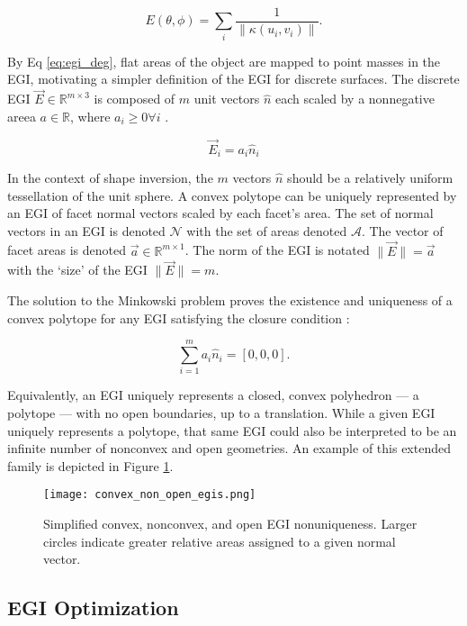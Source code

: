 \begin{equation} \label{eq:egi_deg}
  E(\theta, \phi) = \sum_i{\frac{1}{\| \kappa(u_i, v_i) \|}}.
\end{equation}

By Eq \ref{eq:egi_deg}, flat areas of the object are mapped to point masses in the EGI, motivating a simpler definition of the EGI for discrete surfaces. The discrete EGI $\vec{E} \in \mathbb{R}^{m \times 3}$ is composed of $m$ unit vectors $\hat{n}$ each scaled by a nonnegative areea $a \in \mathbb{R}$, where $a_i \geq 0 \forall i$ \cite{little1983}.

\begin{equation}
  \vec{E}_i = a_i \hat{n}_i
\end{equation}

In the context of shape inversion, the $m$ vectors $\hat{n}$ should be a relatively uniform tessellation of the unit sphere. A convex polytope can be uniquely represented by an EGI of facet normal vectors scaled by each facet's area. The set of normal vectors in an EGI is denoted $\mathcal{N}$ with the set of areas denoted $\mathcal{A}$. The vector of facet areas is denoted $\vec{a} \in \mathbb{R}^{m \times 1}$. The norm of the EGI is notated $\| \vec{E} \| = \vec{a}$ with the `size' of the EGI $\|\vec{E}\| = m$.

The solution to the Minkowski problem proves the existence and uniqueness of a convex polytope for any EGI satisfying the closure condition \cite{minkowski1909}:

\begin{equation} \label{eq:egi_closure}
  \sum_{i=1}^m a_i \hat{n}_i = [0, 0, 0].
\end{equation}

Equivalently, an EGI uniquely represents a closed, convex polyhedron --- a polytope --- with no open boundaries, up to a translation. While a given EGI uniquely represents a polytope, that same EGI could also be interpreted to be an infinite number of nonconvex and open geometries. An example of this extended family is depicted in Figure \ref{fig:egi_family}.

\begin{figure}[!htb]
  \centering
  \texttt{[image: convex\_non\_open\_egis.png]}
  \caption{Simplified convex, nonconvex, and open EGI nonuniqueness. Larger circles indicate greater relative areas assigned to a given normal vector.}
  \label{fig:egi_family}
\end{figure}

\subsection{EGI Optimization}

